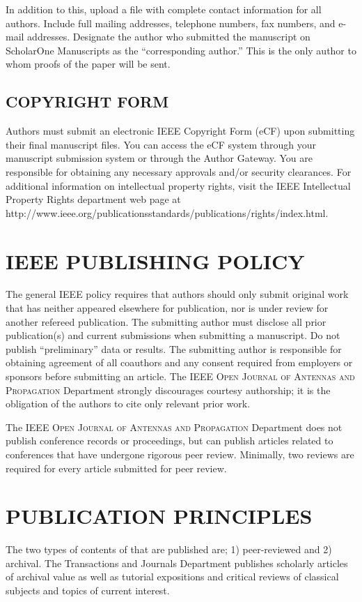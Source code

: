 \documentclass{IEEEoj}
\begin{document}
In addition to this, upload a file with complete contact information for all 
authors. Include full mailing addresses, telephone numbers, fax numbers, and 
e-mail addresses. Designate the author who submitted the manuscript on 
ScholarOne Manuscripts as the ``corresponding author.'' This is the only 
author to whom proofs of the paper will be sent. 

\subsection{COPYRIGHT FORM}
Authors must submit an electronic IEEE Copyright Form (eCF) upon submitting 
their final manuscript files. You can access the eCF system through your 
manuscript submission system or through the Author Gateway. You are 
responsible for obtaining any necessary approvals and/or security 
clearances. For additional information on intellectual property rights, 
visit the IEEE Intellectual Property Rights department web page at 
http://www.ieee.org/publications\textunderscore\discretionary{}{}{}standards/publications/rights/index.html. 

\section{IEEE PUBLISHING POLICY}
The general IEEE policy requires that authors should only submit original 
work that has neither appeared elsewhere for publication, nor is under 
review for another refereed publication. The submitting author must disclose 
all prior publication(s) and current submissions when submitting a 
manuscript. Do not publish ``preliminary'' data or results. The submitting 
author is responsible for obtaining agreement of all coauthors and any 
consent required from employers or sponsors before submitting an article. 
The \textsc{IEEE Open Journal of Antennas and Propagation} Department strongly discourages courtesy authorship; 
it is the obligation of the authors to cite only relevant prior work.

The \textsc{IEEE Open Journal of Antennas and Propagation} Department does not publish conference records or 
proceedings, but can publish articles related to conferences that have 
undergone rigorous peer review. Minimally, two reviews are required for 
every article submitted for peer review.

\section{PUBLICATION PRINCIPLES}
The two types of contents of that are published are; 1) peer-reviewed and 2) 
archival. The Transactions and Journals Department publishes scholarly 
articles of archival value as well as tutorial expositions and critical 
reviews of classical subjects and topics of current interest. 
\end{document}
